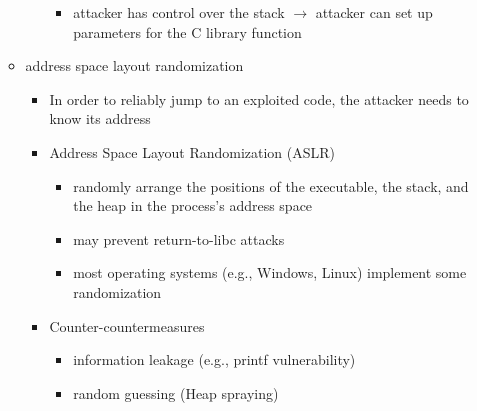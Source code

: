 \documentclass[final]{article}
\begin{document}
\begin{itemize}
\begin{itemize}[nosep]
\begin{itemize}[nosep]
\begin{itemize}[nosep]
                                  \item attacker has control over the stack $\rightarrow$ attacker can set up parameters for the C library function
                              \end{itemize}
                    \end{itemize}
              \item address space layout randomization
                    \begin{itemize}[nosep]
                        \item In order to reliably jump to an exploited code, the attacker needs to know its address
                        \item Address Space Layout Randomization (ASLR)
                              \begin{itemize}[nosep]
                                  \item randomly arrange the positions of the executable, the stack, and the heap in the process’s address space
                                  \item may prevent return-to-libc attacks
                                  \item most operating systems (e.g., Windows, Linux) implement some randomization
                              \end{itemize}
                        \item Counter-countermeasures
                              \begin{itemize}[nosep]
                                  \item information leakage (e.g., printf vulnerability)
                                  \item random guessing (Heap spraying)
                              \end{itemize}
                    \end{itemize}
          \end{itemize}
\end{itemize}
\end{document}
